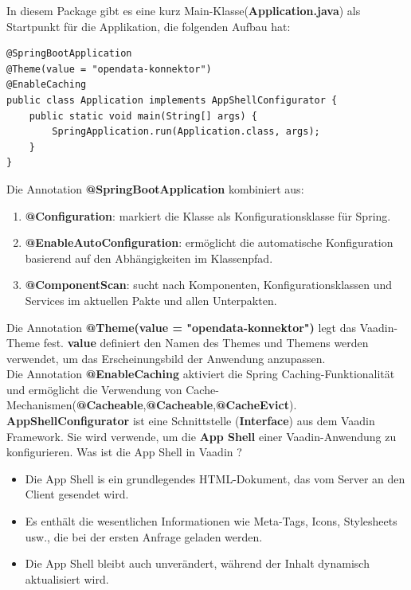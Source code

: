 \documentclass[a4paper,12pt]{scrreprt}
\begin{document}
In diesem Package gibt es eine kurz Main-Klasse(\textbf{Application.java}) als Startpunkt für die Applikation, die folgenden Aufbau hat: \\
\begin{lstlisting}
@SpringBootApplication
@Theme(value = "opendata-konnektor")
@EnableCaching
public class Application implements AppShellConfigurator {
	public static void main(String[] args) {
		SpringApplication.run(Application.class, args);
	}
}
\end{lstlisting}
	Die Annotation \textbf{@SpringBootApplication} kombiniert aus:
		\begin{enumerate}
			\item  \textbf{@Configuration}: markiert die Klasse als Konfigurationsklasse für Spring.
			\item  \textbf{@EnableAutoConfiguration}: ermöglicht die automatische Konfiguration basierend auf den Abhängigkeiten im Klassenpfad.
			\item  \textbf{@ComponentScan}: sucht nach Komponenten, Konfigurationsklassen und Services im aktuellen Pakte und allen Unterpakten.
		\end{enumerate}
	Die Annotation \textbf{@Theme(value = "opendata-konnektor")} legt das Vaadin-Theme fest. \textbf{value} definiert den Namen des Themes und Themens werden verwendet, um das Erscheinungsbild der Anwendung anzupassen.\\
	Die Annotation \textbf{@EnableCaching} aktiviert die Spring Caching-Funktionalität und ermöglicht die Verwendung von Cache-Mechanismen(\textbf{@Cacheable},\textbf{@Cacheable},\textbf{@CacheEvict}).\\
	\textbf{AppShellConfigurator} ist eine Schnittstelle (\textbf{Interface}) aus dem Vaadin Framework. Sie wird verwende, um die \textbf{App Shell} einer Vaadin-Anwendung zu konfigurieren. Was ist die App Shell in Vaadin ?
	\begin{itemize}
		\item Die App Shell is ein grundlegendes HTML-Dokument, das vom Server an den Client gesendet wird.
		\item Es enthält die wesentlichen Informationen wie Meta-Tags, Icons, Stylesheets usw., die bei der ersten Anfrage geladen werden.
		\item Die App Shell bleibt auch unverändert, während der Inhalt dynamisch aktualisiert wird.
	\end{itemize}
	
\end{document}
